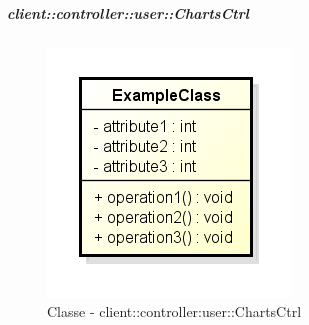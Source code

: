 		\subparagraph{client::controller::user::ChartsCtrl} %
		\label{subp:client_controller_user_chartsctrl}
			\begin{figure}[htbp]
				\centering
				\centerline{\includegraphics[scale=0.7]{./images/client/classes/example_class.png}}
				\caption{Classe - client::controller:user::ChartsCtrl}
			\end{figure}
